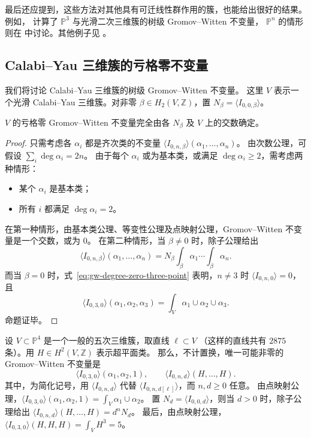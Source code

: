 最后还应提到，这些方法对其他具有可迁线性群作用的簇，也能给出很好的结果。
例如， 计算了 $\mathbb P^3$ 与光滑二次三维簇的树级 Gromov--Witten 不变量，
$\mathbb P^n$ 的情形则在  中讨论。其他例子见 。

\subsection{Calabi--Yau 三维簇的亏格零不变量}\label{subsec:cy-genus-zero}
我们将讨论 Calabi--Yau 三维簇的树级 Gromov--Witten 不变量。
这里 $V$ 表示一个光滑 Calabi--Yau 三维簇。对非零 $\beta\in H_2(V,\mathbb Z)$，置 $N_\beta=\langle I_{0,0,\beta}\rangle$。
\begin{proposition}\label{prop:cy-gw-determined}
$V$ 的亏格零 Gromov--Witten 不变量完全由各 $N_\beta$ 及 $V$ 上的交数确定。
\end{proposition}
\begin{proof}
只需考虑各 $\alpha_i$ 都是齐次类的不变量 $\langle I_{0,n,\beta}\rangle(\alpha_1,\ldots,\alpha_n)$。
由次数公理，可假设 $\sum_i\deg\alpha_i=2n$。
由于每个 $\alpha_i$ 或为基本类，或满足 $\deg\alpha_i\geq2$，需考虑两种情形：
\begin{itemize}
\item 某个 $\alpha_i$ 是基本类；
\item 所有 $i$ 都满足 $\deg\alpha_i=2$。
\end{itemize}
在第一种情形，由基本类公理、等变性公理及点映射公理，Gromov--Witten 不变量是一个交数，或为 $0$。
在第二种情形，当 $\beta\ne0$ 时，除子公理给出
\[
\langle I_{0,n,\beta}\rangle(\alpha_1,\ldots,\alpha_n)=N_\beta\int_\beta\alpha_1\cdots\int_\beta\alpha_n.
\]
而当 $\beta=0$ 时，式~\eqref{eq:gw-degree-zero-three-point} 表明，$n\ne3$ 时 $\langle I_{0,n,0}\rangle=0$，且
\[
\langle I_{0,3,0}\rangle(\alpha_1,\alpha_2,\alpha_3)=\int_V\alpha_1\cup\alpha_2\cup\alpha_3.
\]
命题证毕。
\end{proof}
\begin{example}\label{ex:quintic-gw-types}
设 $V\subset\mathbb P^4$ 是一个一般的五次三维簇，取直线 $\ell\subset V$
（这样的直线共有 $2875$ 条）。用 $H\in H^2(V,\mathbb Z)$ 表示超平面类。
那么，不计置换，唯一可能非零的 Gromov--Witten 不变量是
\[
\langle I_{0,3,0}\rangle(\alpha_1,\alpha_2,1),\qquad\langle I_{0,n,d}\rangle(H,\ldots,H).
\]
其中，为简化记号，用 $\langle I_{0,n,d}\rangle$ 代替 $\langle I_{0,n,d[\ell]}\rangle$，而 $n,d\geq0$ 任意。
由点映射公理，$\langle I_{0,3,0}\rangle(\alpha_1,\alpha_2,1)=\int_V\alpha_1\cup\alpha_2$。
置 $N_d=\langle I_{0,0,d}\rangle$，则当 $d>0$ 时，除子公理给出
$\langle I_{0,n,d}\rangle(H,\ldots,H)=d^nN_d$。
最后，由点映射公理，$\langle I_{0,3,0}\rangle(H,H,H)=\int_VH^3=5$。
\end{example}
